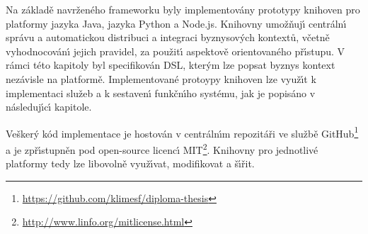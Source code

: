 Na základě navrženého frameworku byly implementovány prototypy
knihoven pro platformy jazyka Java, jazyka Python a
Node.js. Knihovny umožňuj\'{\i} centráln\'{\i} správu a automatickou distribuci a integraci
byznysov\'ych kontextů, včetně vyhodnocován\'{\i} jejich pravidel, za
použit\'{\i} aspektově orientovaného př\'{\i}stupu.
V rámci této kapitoly byl specifikován \gls{DSL}, kter\'ym lze popsat
byznys kontext nezávisle na platformě.
Implementované protoypy knihoven lze využ\'{\i}t k implementaci služeb a k sestaven\'{\i}
funkčn\'{\i}ho systému, jak je popisáno v následuj\'{\i}c\'{\i} kapitole.

Vešker\'y kód implementace je hostován v centráln\'{\i}m repozitáři
ve službě GitHub\footnote{\url{https://github.com/klimesf/diploma-thesis}}
a je zpř\'{\i}stupněn pod open-source licenc\'{\i} \gls{MIT}\footnote{\url{http://www.linfo.org/mitlicense.html}}.
Knihovny pro jednotlivé platformy tedy lze libovolně
využ\'{\i}vat, modifikovat a š\'{\i}řit.
